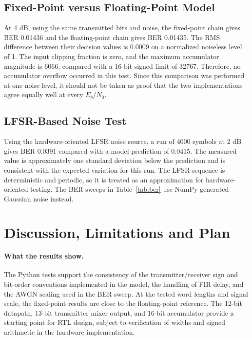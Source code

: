 \documentclass[10pt,twocolumn,letterpaper]{article}
\begin{document}
\subsection{Fixed-Point versus Floating-Point Model}
At 4 dB, using the same transmitted bits and noise, the fixed-point chain gives BER 0.01436 and the floating-point chain gives BER 0.01435. The RMS difference between their decision values is 0.0009 on a normalized noiseless level of 1. The input clipping fraction is zero, and the maximum accumulator magnitude is 6066, compared with a 16-bit signed limit of 32767. Therefore, no accumulator overflow occurred in this test. Since this comparison was performed at one noise level, it should not be taken as proof that the two implementations agree equally well at every $E_b/N_0$.

\subsection{LFSR-Based Noise Test}
Using the hardware-oriented LFSR noise source, a run of 4000 symbols at 2 dB gives BER 0.0391 compared with a model prediction of 0.0415. The measured value is approximately one standard deviation below the prediction and is consistent with the expected variation for this run. The LFSR sequence is deterministic and periodic, so it is treated as an approximation for hardware-oriented testing. The BER sweeps in Table~\ref{tab:ber} use NumPy-generated Gaussian noise instead.

\section{Discussion, Limitations and Plan}

\paragraph{What the results show.}
The Python tests support the consistency of the transmitter/receiver sign and bit-order conventions implemented in the model, the handling of FIR delay, and the AWGN scaling used in the BER sweep. At the tested word lengths and signal scale, the fixed-point results are close to the floating-point reference. The 12-bit datapath, 13-bit transmitter mixer output, and 16-bit accumulator provide a starting point for RTL design, subject to verification of widths and signed arithmetic in the hardware implementation.
\end{document}
